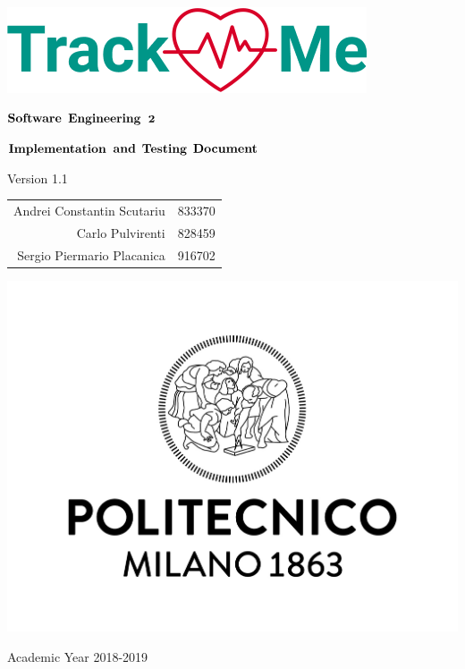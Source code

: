 \documentclass{article}
\author{
\and
\and
}
\date{}
\title{}
\begin{document}

\thispagestyle{empty} %
\begin{center}
	\includegraphics[scale=0.8]{images/logo.png}



	\vspace{3cm}

	\large $\bf \large Software$ $\bf Engineering$ $\bf 2$

	\vspace{3mm}

	\LARGE $\bf Implementation$  $\bf and$ $\bf Testing$ $\bf Document$

	\vspace{2mm}
	\small Version 1.1

	\vspace{1cm}

	\begin{tabular}{r|l}
		\large Andrei Constantin Scutariu & \large 833370\\
		\large Carlo Pulvirenti & \large 828459\\
		\large Sergio Piermario Placanica & \large 916702\\
	\end{tabular}

	\vspace{3cm}

	\includegraphics[scale=0.15]{images/logoPolimi.jpg}

	\vspace{3mm}
	Academic Year 2018-2019


	\end{center}
\end{document}
